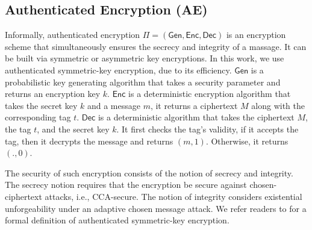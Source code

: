 
 \vspace{-4mm}
 
\subsection{Authenticated Encryption (AE)} 
 \vspace{-1mm}

Informally, authenticated encryption $\Pi=(\mathsf{Gen}, \mathsf{Enc}, \mathsf{Dec})$ is an encryption scheme that simultaneously ensures the secrecy and integrity of a massage. It can be built via symmetric or asymmetric key encryptions. In this work, we use authenticated symmetric-key encryption, due to its efficiency. $\mathsf{Gen}$ is a probabilistic key generating algorithm that takes a security parameter and returns an encryption key $k$. $\mathsf{Enc}$ is a deterministic encryption algorithm that takes the secret key $k$ and a message $m$, it returns a ciphertext $M$ along with the corresponding tag $t$. $\mathsf{Dec}$ is a deterministic algorithm that takes the ciphertext $M$, the tag $t$, and the secret key $k$. It first checks the tag's validity, if it accepts the tag, then it decrypts the message and returns $(m,1)$. Otherwise, it returns $(.,0)$. 


The security of such encryption consists of the notion of secrecy and integrity. The secrecy notion requires that the encryption be secure against chosen-ciphertext attacks, i.e., CCA-secure. The notion of integrity considers existential unforgeability under an adaptive chosen message attack. We refer readers to \cite{KatzLindell2014} for a formal definition of authenticated symmetric-key encryption. 



